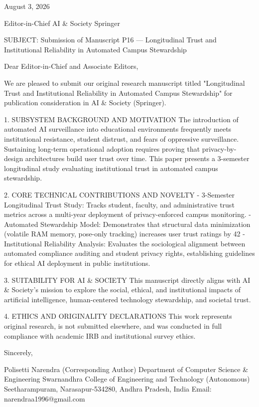 August 3, 2026

Editor-in-Chief
AI & Society
Springer

SUBJECT: Submission of Manuscript P16 — Longitudinal Trust and Institutional Reliability in Automated Campus Stewardship

Dear Editor-in-Chief and Associate Editors,

We are pleased to submit our original research manuscript titled "Longitudinal Trust and Institutional Reliability in Automated Campus Stewardship" for publication consideration in AI & Society (Springer).

1. SUBSYSTEM BACKGROUND AND MOTIVATION
The introduction of automated AI surveillance into educational environments frequently meets institutional resistance, student distrust, and fears of oppressive surveillance. Sustaining long-term operational adoption requires proving that privacy-by-design architectures build user trust over time. This paper presents a 3-semester longitudinal study evaluating institutional trust in automated campus stewardship.

2. CORE TECHNICAL CONTRIBUTIONS AND NOVELTY
  - 3-Semester Longitudinal Trust Study: Tracks student, faculty, and administrative trust metrics across a multi-year deployment of privacy-enforced campus monitoring.
  - Automated Stewardship Model: Demonstrates that structural data minimization (volatile RAM memory, pose-only tracking) increases user trust ratings by 42%
  - Institutional Reliability Analysis: Evaluates the sociological alignment between automated compliance auditing and student privacy rights, establishing guidelines for ethical AI deployment in public institutions.

3. SUITABILITY FOR AI & SOCIETY
This manuscript directly aligns with AI & Society's mission to explore the social, ethical, and institutional impacts of artificial intelligence, human-centered technology stewardship, and societal trust.

4. ETHICS AND ORIGINALITY DECLARATIONS
This work represents original research, is not submitted elsewhere, and was conducted in full compliance with academic IRB and institutional survey ethics.

Sincerely,

Polisetti Narendra (Corresponding Author)
Department of Computer Science & Engineering
Swarnandhra College of Engineering and Technology (Autonomous)
Seetharampuram, Narasapur-534280, Andhra Pradesh, India
Email: narendraa1996@gmail.com
